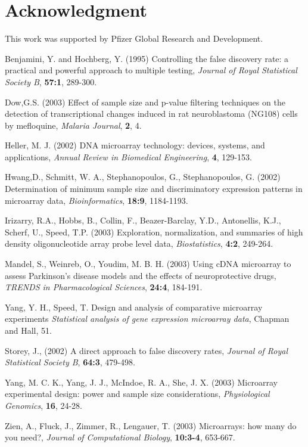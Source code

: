 \documentclass{bioinfo}
\begin{document}
\section*{Acknowledgment}

This work was supported by Pfizer Global Research and Development.

\begin{thebibliography}{}

 Benjamini, Y.
  and Hochberg, Y. (1995) Controlling the false discovery rate: a
  practical and powerful approach to multiple testing, {\it Journal
  of Royal Statistical Society B}, {\bf 57:1}, 289-300.

 Dow,G.S. (2003) Effect of sample size
  and p-value filtering techniques on the detection of
  transcriptional changes induced in rat neuroblastoma (NG108) cells
  by mefloquine, {\it Malaria Journal}, {\bf 2}, 4.

 Heller, M. J. (2002) {DNA
  microarray technology: devices, systems, and applications}, {\it
  Annual Review in Biomedical Engineering}, {\bf 4}, 129-153.

 Hwang,D., Schmitt,
  W. A., Stephanopoulos, G., Stephanopoulos, G. (2002) Determination
  of minimum sample size and discriminatory expression patterns in
  microarray data, {\it Bioinformatics}, {\bf 18:9}, 1184-1193.

 Irizarry, R.A.,
  Hobbs, B., Collin, F., Beazer-Barclay, Y.D., Antonellis, K.J.,
  Scherf, U., Speed, T.P. (2003) Exploration, normalization, and
  summaries of high density oligonucleotide array probe level data,
  {\it Biostatistics}, {\bf 4:2}, 249-264.

 Mandel, S.,  Weinreb,
  O., Youdim, M. B. H. (2003) Using cDNA microarray to assess
  Parkinson's disease models and the effects of neuroprotective
  drugs, {\it TRENDS in Pharmacological Sciences}, {\bf 24:4},
  184-191.

 Yang, Y. H., Speed, T.
  {Design and analysis of comparative microarray experiments \it
  Statistical analysis of gene expression microarray data}, {Chapman
  and Hall}, 51.

 Storey, J., (2002)
  A direct approach to false discovery rates, {\it Journal of Royal
  Statistical Society B}, {\bf 64:3}, 479-498.

 Yang, M. C. K., Yang,
  J. J., McIndoe, R. A., She, J. X. (2003) Microarray experimental
  design: power and sample size considerations, {\it Physiological
  Genomics}, {\bf 16}, 24-28.

 Zien, A., Fluck, J.,
  Zimmer, R., Lengauer, T. (2003) Microarrays: how many do you
  need?, {\it Journal of Computational Biology}, {\bf 10:3-4},
  653-667.

\end{thebibliography}
\end{document}
